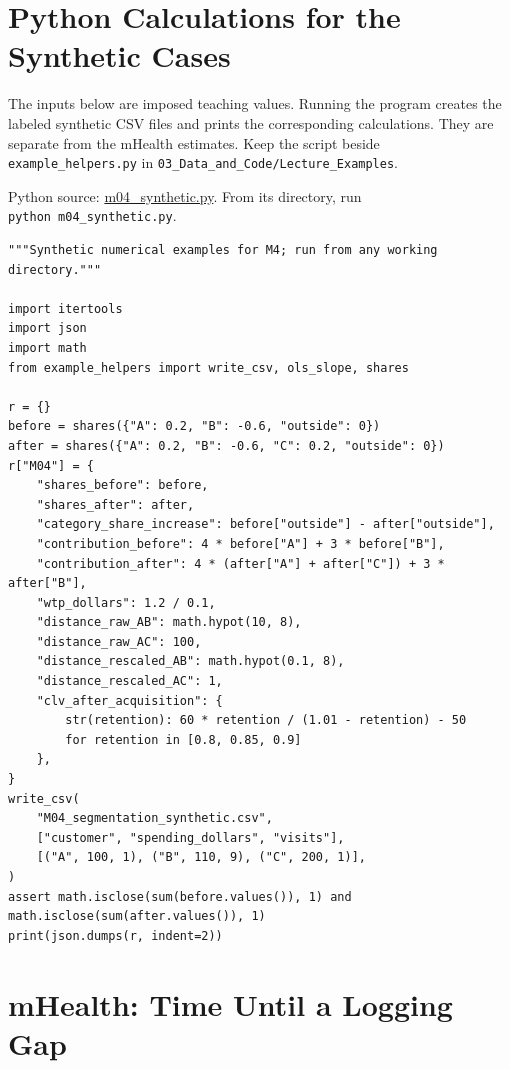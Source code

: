\hypertarget{M04-python-calculations-for-the-synthetic-cases}{%
\section{Python Calculations for the Synthetic
Cases}\label{M04-python-calculations-for-the-synthetic-cases}}

\noindent The inputs below are imposed teaching values. Running the program
creates the labeled synthetic CSV files and prints the corresponding
calculations. They are separate from the mHealth estimates. Keep the
script beside \texttt{example\_helpers.py} in
\texttt{03\_Data\_and\_Code/Lecture\_Examples}.

\FloatBarrier
{}
Python source:
\href{../03_Data_and_Code/Lecture_Examples/m04_synthetic.py}{m04\_synthetic.py}.
From its directory, run \texttt{python\ m04\_synthetic.py}.

\begin{Verbatim}[breaklines,breakanywhere,fontsize=\small]
"""Synthetic numerical examples for M4; run from any working directory."""

import itertools
import json
import math
from example_helpers import write_csv, ols_slope, shares

r = {}
before = shares({"A": 0.2, "B": -0.6, "outside": 0})
after = shares({"A": 0.2, "B": -0.6, "C": 0.2, "outside": 0})
r["M04"] = {
    "shares_before": before,
    "shares_after": after,
    "category_share_increase": before["outside"] - after["outside"],
    "contribution_before": 4 * before["A"] + 3 * before["B"],
    "contribution_after": 4 * (after["A"] + after["C"]) + 3 * after["B"],
    "wtp_dollars": 1.2 / 0.1,
    "distance_raw_AB": math.hypot(10, 8),
    "distance_raw_AC": 100,
    "distance_rescaled_AB": math.hypot(0.1, 8),
    "distance_rescaled_AC": 1,
    "clv_after_acquisition": {
        str(retention): 60 * retention / (1.01 - retention) - 50
        for retention in [0.8, 0.85, 0.9]
    },
}
write_csv(
    "M04_segmentation_synthetic.csv",
    ["customer", "spending_dollars", "visits"],
    [("A", 100, 1), ("B", 110, 9), ("C", 200, 1)],
)
assert math.isclose(sum(before.values()), 1) and math.isclose(sum(after.values()), 1)
print(json.dumps(r, indent=2))
\end{Verbatim}

\hypertarget{M04-mhealth-time-until-a-logging-gap}{%
\section{mHealth: Time Until a Logging
Gap}\label{M04-mhealth-time-until-a-logging-gap}}

